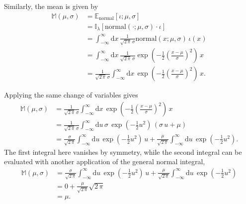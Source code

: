 \documentclass[
  letterpaper,
  DIV=11,
  numbers=noendperiod]{scrartcl}
\begin{document}
Similarly, the mean is given by \begin{align*}
\mathbb{M}(\mu, \sigma)
&=
\mathbb{E}_{\mathrm{normal}}[ \iota ; \mu, \sigma ]
\\
&=
\mathbb{I}_{\lambda}[
  \mathrm{normal}(\cdot; \mu, \sigma) \cdot \iota
]
\\
&=
\int_{-\infty}^{\infty} \mathrm{d} x \,
\frac{1}{\sqrt{2 \, \pi} \, \sigma}
\mathrm{normal}(x; \mu, \sigma) \, \iota(x)
\\
&=
\int_{-\infty}^{\infty} \mathrm{d} x \,
\frac{1}{\sqrt{2 \, \pi} \, \sigma}
\exp \left(
  -\frac{1}{2} \left( \frac{x - \mu}{\sigma} \right)^{2}
\right) \, x
\\
&=
\frac{1}{\sqrt{2 \, \pi} \, \sigma}
\int_{-\infty}^{\infty} \mathrm{d} x \,
\exp \left(
  -\frac{1}{2} \left( \frac{x - \mu}{\sigma} \right)^{2}
\right) \, x.
\end{align*}

Applying the same change of variables gives \begin{align*}
\mathbb{M}(\mu, \sigma)
&=
\frac{1}{\sqrt{2 \, \pi} \, \sigma}
\int_{-\infty}^{\infty} \mathrm{d} x \,
\exp \left(
  -\frac{1}{2} \left( \frac{x - \mu}{\sigma} \right)^{2}
\right) \, x
\\
&=
\frac{1}{\sqrt{2 \, \pi} \, \sigma}
\int_{-\infty}^{\infty} \mathrm{d} u \, \sigma \,
\exp \left( -\frac{1}{2} u^{2} \right) \,
\left( \sigma \, u + \mu \right)
\\
&=
\frac{\sigma}{\sqrt{2 \, \pi}}
\int_{-\infty}^{\infty} \mathrm{d} u \,
\exp \left( -\frac{1}{2} u^{2} \right) \, u
+
\frac{\mu}{\sqrt{2 \, \pi}}
\int_{-\infty}^{\infty} \mathrm{d} u \,
\exp \left( -\frac{1}{2} u^{2} \right).
\end{align*} The first integral here vanishes by symmetry, while the
second integral can be evaluated with another application of the general
normal integral, \begin{align*}
\mathbb{M}(\mu, \sigma)
&=
\frac{\sigma}{\sqrt{2 \, \pi}}
\int_{-\infty}^{\infty} \mathrm{d} u \,
\exp \left( -\frac{1}{2} u^{2} \right) \, u
+
\frac{\mu}{\sqrt{2 \, \pi}}
\int_{-\infty}^{\infty} \mathrm{d} u \,
\exp \left( -\frac{1}{2} u^{2} \right)
\\
&=
0
+
\frac{\mu}{\sqrt{2 \, \pi}} \sqrt{2 \, \pi}
\\
&=
\mu.
\end{align*}
\end{document}
